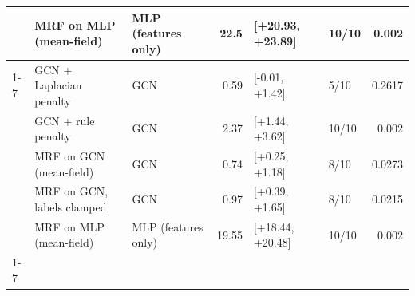 \begin{tabular}{lllrllr}
 & MRF on MLP (mean-field) & MLP (features only) & 22.5 & [+20.93, +23.89] & 10/10 & 0.002 \\
\cline{1-7}
\multirow[t]{5}{*}{20.000000} & GCN + Laplacian penalty & GCN & 0.59 & [-0.01, +1.42] & 5/10 & 0.2617 \\
 & GCN + rule penalty & GCN & 2.37 & [+1.44, +3.62] & 10/10 & 0.002 \\
 & MRF on GCN (mean-field) & GCN & 0.74 & [+0.25, +1.18] & 8/10 & 0.0273 \\
 & MRF on GCN, labels clamped & GCN & 0.97 & [+0.39, +1.65] & 8/10 & 0.0215 \\
 & MRF on MLP (mean-field) & MLP (features only) & 19.55 & [+18.44, +20.48] & 10/10 & 0.002 \\
\cline{1-7}
\bottomrule
\end{tabular}
